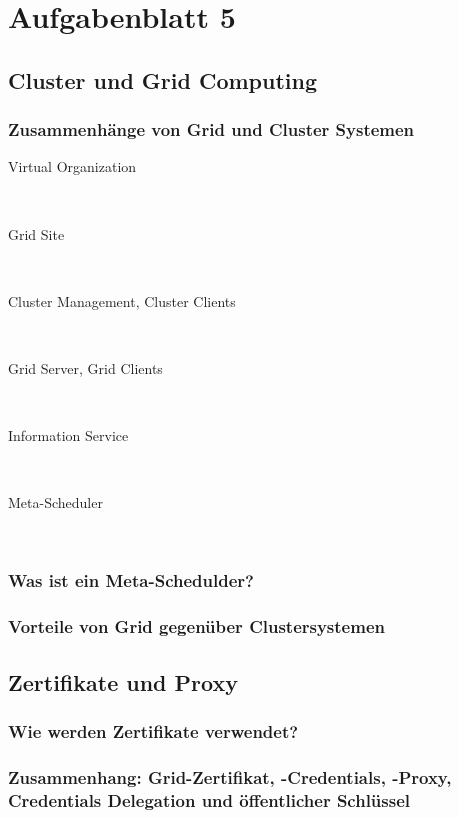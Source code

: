 \section{Aufgabenblatt 5}
\subsection{Cluster und Grid Computing}

	\subsubsection*{Zusammenhänge von Grid und Cluster Systemen}
		\begin{description}
			\item[Virtual Organization]\hfill \\
			\item[Grid Site]\hfill \\
			\item[Cluster Management, Cluster Clients]\hfill \\
			\item[Grid Server, Grid Clients]\hfill \\
			\item[Information Service]\hfill \\
			\item[Meta-Scheduler]\hfill \\
		\end{description}

	\subsubsection*{Was ist ein Meta-Schedulder?}
	\subsubsection*{Vorteile von Grid gegenüber Clustersystemen}

\subsection{Zertifikate und Proxy}
	\subsubsection*{Wie werden Zertifikate verwendet?}
	\subsubsection*{Zusammenhang: Grid-Zertifikat, -Credentials, -Proxy, Credentials Delegation und öffentlicher Schlüssel}

